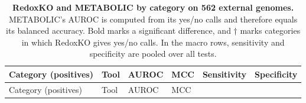 \documentclass[10pt,a4paper,onecolumn]{article}
\begin{document}
{\begin{longtable}[]{@{}
  >{\raggedright\arraybackslash}p{}
  >{\raggedright\arraybackslash}p{}
  >{\raggedleft\arraybackslash}p{}
  >{\raggedleft\arraybackslash}p{}
  >{\raggedleft\arraybackslash}p{}
  >{\raggedleft\arraybackslash}p{}@{}}
\caption{\textbf{RedoxKO and METABOLIC by category on 562 external
genomes.} METABOLIC's AUROC is computed from its yes/no calls and
therefore equals its balanced accuracy. Bold marks a significant
difference, and † marks categories in which RedoxKO gives yes/no calls.
In the macro rows, sensitivity and specificity are pooled over all
tests. \label{tab:s_metabolic}}\tabularnewline
\toprule\noalign{}
\begin{minipage}[b]{\linewidth}\raggedright
Category (positives)
\end{minipage} & \begin{minipage}[b]{\linewidth}\raggedright
Tool
\end{minipage} & \begin{minipage}[b]{\linewidth}\raggedleft
AUROC
\end{minipage} & \begin{minipage}[b]{\linewidth}\raggedleft
MCC
\end{minipage} & \begin{minipage}[b]{\linewidth}\raggedleft
Sensitivity
\end{minipage} & \begin{minipage}[b]{\linewidth}\raggedleft
Specificity
\end{minipage} \\
\midrule\noalign{}
\endfirsthead
\toprule\noalign{}
\begin{minipage}[b]{\linewidth}\raggedright
Category (positives)
\end{minipage} & \begin{minipage}[b]{\linewidth}\raggedright
Tool
\end{minipage} & \begin{minipage}[b]{\linewidth}\raggedleft
AUROC
\end{minipage} & \begin{minipage}[b]{\linewidth}\raggedleft
MCC
\end{minipage} & \begin{minipage}[b]{\linewidth}\raggedleft

\end{minipage}
\end{longtable}}
\end{document}

